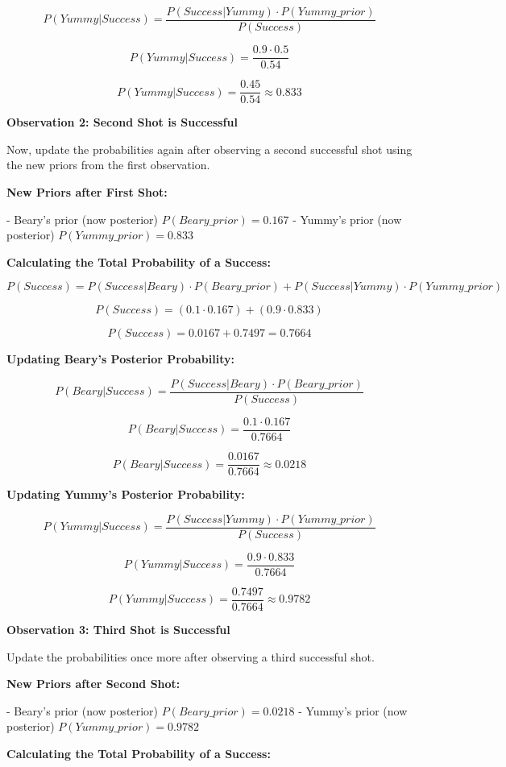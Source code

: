 \documentclass[12pt]{book} %
\begin{document}
\[ P(Yummy|Success) = \frac{P(Success|Yummy) \cdot P(Yummy\_prior)}{P(Success)} \]

\[ P(Yummy|Success) = \frac{0.9 \cdot 0.5}{0.54} \]

\[ P(Yummy|Success) = \frac{0.45}{0.54} \approx 0.833 \]

\textbf{Observation 2: Second Shot is Successful}

Now, update the probabilities again after observing a second successful shot using the new priors from the first observation.

\textbf{New Priors after First Shot:}

- Beary's prior (now posterior) \( P(Beary\_prior) = 0.167 \)
- Yummy's prior (now posterior) \( P(Yummy\_prior) = 0.833 \)

\textbf{Calculating the Total Probability of a Success:}

\[ P(Success) = P(Success|Beary) \cdot P(Beary\_prior) + P(Success|Yummy) \cdot P(Yummy\_prior) \]

\[ P(Success) = (0.1 \cdot 0.167) + (0.9 \cdot 0.833) \]

\[ P(Success) = 0.0167 + 0.7497 = 0.7664 \]

\textbf{Updating Beary's Posterior Probability:}

\[ P(Beary|Success) = \frac{P(Success|Beary) \cdot P(Beary\_prior)}{P(Success)} \]

\[ P(Beary|Success) = \frac{0.1 \cdot 0.167}{0.7664} \]

\[ P(Beary|Success) = \frac{0.0167}{0.7664} \approx 0.0218 \]

\textbf{Updating Yummy's Posterior Probability:}

\[ P(Yummy|Success) = \frac{P(Success|Yummy) \cdot P(Yummy\_prior)}{P(Success)} \]

\[ P(Yummy|Success) = \frac{0.9 \cdot 0.833}{0.7664} \]

\[ P(Yummy|Success) = \frac{0.7497}{0.7664} \approx 0.9782 \]

\textbf{Observation 3: Third Shot is Successful}

Update the probabilities once more after observing a third successful shot.

\textbf{New Priors after Second Shot:}

- Beary's prior (now posterior) \( P(Beary\_prior) = 0.0218 \)
- Yummy's prior (now posterior) \( P(Yummy\_prior) = 0.9782 \)

\textbf{Calculating the Total Probability of a Success:}
\end{document}
